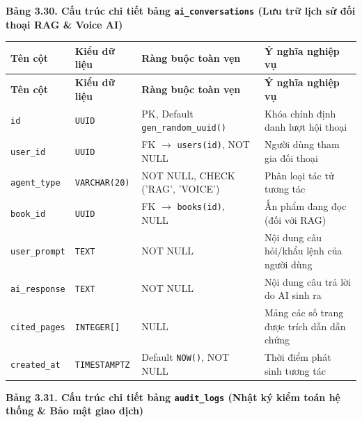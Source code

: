 \documentclass[11pt, a4paper]{report}
\begin{document}
\vspace{0.3cm}
\noindent\textbf{Bảng 3.30. Cấu trúc chi tiết bảng \texttt{ai\_conversations} (Lưu trữ lịch sử đối thoại RAG \& Voice AI)}
\nopagebreak

\begin{longtable}{p{3.2cm} p{2.6cm} p{4.0cm} p{4.5cm}}
\toprule
\textbf{Tên cột} & \textbf{Kiểu dữ liệu} & \textbf{Ràng buộc toàn vẹn} & \textbf{Ý nghĩa nghiệp vụ} \\
\midrule
\endfirsthead
\toprule
\textbf{Tên cột} & \textbf{Kiểu dữ liệu} & \textbf{Ràng buộc toàn vẹn} & \textbf{Ý nghĩa nghiệp vụ} \\
\midrule
\endhead
\bottomrule
\endfoot
\texttt{id} & \texttt{UUID} & PK, Default \texttt{gen\_random\_uuid()} & Khóa chính định danh lượt hội thoại \\
\midrule
\texttt{user\_id} & \texttt{UUID} & FK $\rightarrow$ \texttt{users(id)}, NOT NULL & Người dùng tham gia đối thoại \\
\midrule
\texttt{agent\_type} & \texttt{VARCHAR(20)} & NOT NULL, CHECK ('RAG', 'VOICE') & Phân loại tác tử tương tác \\
\midrule
\texttt{book\_id} & \texttt{UUID} & FK $\rightarrow$ \texttt{books(id)}, NULL & Ấn phẩm đang đọc (đối với RAG) \\
\midrule
\texttt{user\_prompt} & \texttt{TEXT} & NOT NULL & Nội dung câu hỏi/khẩu lệnh của người dùng \\
\midrule
\texttt{ai\_response} & \texttt{TEXT} & NOT NULL & Nội dung câu trả lời do AI sinh ra \\
\midrule
\texttt{cited\_pages} & \texttt{INTEGER[]} & NULL & Mảng các số trang được trích dẫn dẫn chứng \\
\midrule
\texttt{created\_at} & \texttt{TIMESTAMPTZ} & Default \texttt{NOW()}, NOT NULL & Thời điểm phát sinh tương tác \\
\bottomrule
\end{longtable}

\vspace{0.3cm}
\noindent\textbf{Bảng 3.31. Cấu trúc chi tiết bảng \texttt{audit\_logs} (Nhật ký kiểm toán hệ thống \& Bảo mật giao dịch)}
\nopagebreak
\end{document}
